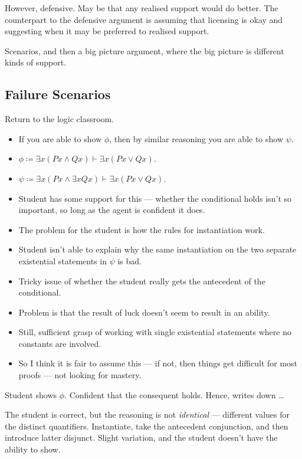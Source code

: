 \documentclass[10pt]{article}
\begin{document}
However, defensive.
May be that any realised support would do better.
The counterpart to the defensive argument is assuming that licensing is okay and suggesting when it may be preferred to realised support.

Scenarios, and then a big picture argument, where the big picture is different kinds of support.

\subsection{Failure Scenarios}
\label{sec:failure-scenarios}

\begin{note}
  Return to the logic classroom.

  \begin{itemize}
  \item If you are able to show \(\phi\), then by similar reasoning you are able to show \(\psi\).
  \item \(\phi \coloneq \exists x(Px \land Qx) \vdash \exists x(Px \lor Qx)\).
  \item \(\psi \coloneq \exists x (Px \land \exists x Qx) \vdash \exists x(Px \lor Qx)\).
  \item Student has some support for this --- whether the conditional holds isn't so important, so long as the agent is confident it does.
  \item The problem for the student is how the rules for instantiation work.
  \item Student isn't able to explain why the same instantiation on the two separate existential statements in \(\psi\) is bad.
  \item Tricky issue of whether the student really gets the antecedent of the conditional.
  \item Problem is that the result of luck doesn't seem to result in an ability.
  \item Still, sufficient grasp of working with single existential statements where no constants are involved.
  \item So I think it is fair to assume this --- if not, then things get difficult for most proofs --- not looking for mastery.
  \end{itemize}

  Student shows \(\phi\).
  Confident that the consequent holds.
  Hence, writes down \dots

  The student is correct, but the reasoning is not \emph{identical} --- different values for the distinct quantifiers.
  Instantiate, take the antecedent conjunction, and then introduce latter disjunct.
  Slight variation, and the student doesn't have the ability to show.


\end{note}
\end{document}
